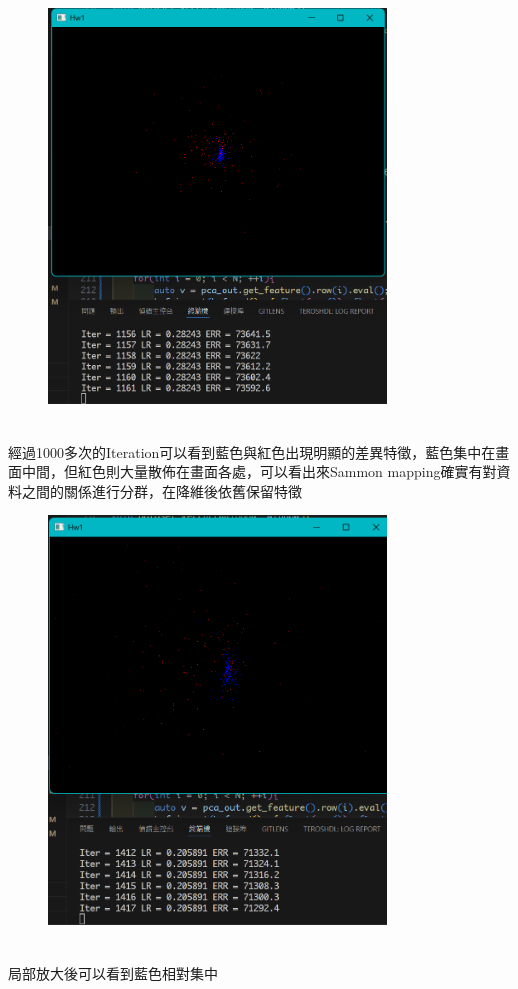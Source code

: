 \documentclass[a4paper,12pt]{article}
\begin{document}
\begin{figure}[H]
    \centering
    \includegraphics[width=0.8\textwidth]{img/img0.png}
\end{figure}\\
經過1000多次的Iteration可以看到藍色與紅色出現明顯的差異特徵，藍色集中在畫面中間，但紅色則大量散佈在畫面各處，可以看出來Sammon mapping確實有對資料之間的關係進行分群，在降維後依舊保留特徵

\begin{figure}[H]
    \centering
    \includegraphics[width=0.8\textwidth]{img/img1.png}
\end{figure}\\
局部放大後可以看到藍色相對集中
\end{document}
